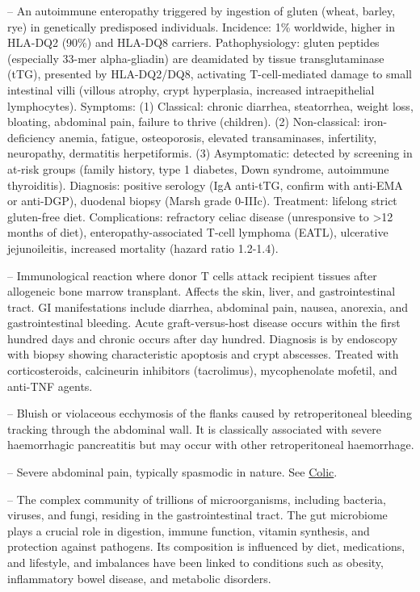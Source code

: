 -- An autoimmune enteropathy triggered by ingestion of gluten (wheat, barley, rye) in genetically predisposed individuals. Incidence: 1\% worldwide, higher in HLA-DQ2 (90\%) and HLA-DQ8 carriers. Pathophysiology: gluten peptides (especially 33-mer alpha-gliadin) are deamidated by tissue transglutaminase (tTG), presented by HLA-DQ2/DQ8, activating T-cell-mediated damage to small intestinal villi (villous atrophy, crypt hyperplasia, increased intraepithelial lymphocytes). Symptoms: (1) Classical: chronic diarrhea, steatorrhea, weight loss, bloating, abdominal pain, failure to thrive (children). (2) Non-classical: iron-deficiency anemia, fatigue, osteoporosis, elevated transaminases, infertility, neuropathy, dermatitis herpetiformis. (3) Asymptomatic: detected by screening in at-risk groups (family history, type 1 diabetes, Down syndrome, autoimmune thyroiditis). Diagnosis: positive serology (IgA anti-tTG, confirm with anti-EMA or anti-DGP), duodenal biopsy (Marsh grade 0-IIIc). Treatment: lifelong strict gluten-free diet. Complications: refractory celiac disease (unresponsive to >12 months of diet), enteropathy-associated T-cell lymphoma (EATL), ulcerative jejunoileitis, increased mortality (hazard ratio 1.2-1.4).

-- Immunological reaction where donor T cells attack recipient tissues after allogeneic bone marrow transplant. Affects the skin, liver, and gastrointestinal tract. GI manifestations include diarrhea, abdominal pain, nausea, anorexia, and gastrointestinal bleeding. Acute graft-versus-host disease occurs within the first hundred days and chronic occurs after day hundred. Diagnosis is by endoscopy with biopsy showing characteristic apoptosis and crypt abscesses. Treated with corticosteroids, calcineurin inhibitors (tacrolimus), mycophenolate mofetil, and anti-TNF agents.

-- Bluish or violaceous ecchymosis of the flanks caused by retroperitoneal bleeding tracking through the abdominal wall. It is classically associated with severe haemorrhagic pancreatitis but may occur with other retroperitoneal haemorrhage.

-- Severe abdominal pain, typically spasmodic in nature. See \hyperlink{Colic}{Colic}.

-- The complex community of trillions of microorganisms, including bacteria, viruses, and fungi, residing in the gastrointestinal tract. The gut microbiome plays a crucial role in digestion, immune function, vitamin synthesis, and protection against pathogens. Its composition is influenced by diet, medications, and lifestyle, and imbalances have been linked to conditions such as obesity, inflammatory bowel disease, and metabolic disorders.


